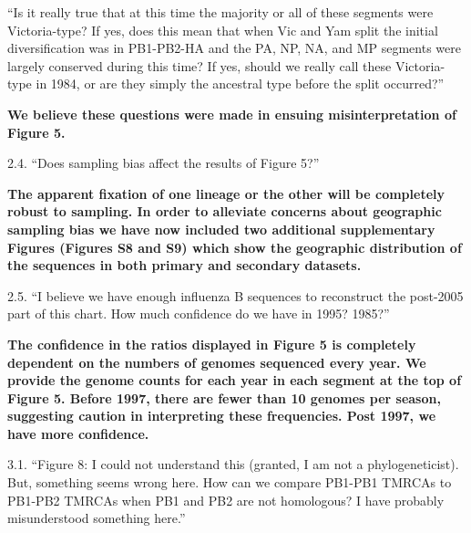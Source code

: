 \documentclass[11pt,oneside,letterpaper]{article}
\begin{document}
``Is it really true that at this time the majority or all of these segments were Victoria-type?
If yes, does this mean that when Vic and Yam split the initial diversification was in PB1-PB2-HA and the PA, NP, NA, and MP segments were largely conserved during this time?
If yes, should we really call these Victoria-type in 1984, or are they simply the ancestral type before the split occurred?''

\textbf{We believe these questions were made in ensuing misinterpretation of Figure 5.}

2.4. ``Does sampling bias affect the results of Figure 5?''

\textbf{The apparent fixation of one lineage or the other will be completely robust to sampling.
In order to alleviate concerns about geographic sampling bias we have now included two additional supplementary Figures (Figures S8 and S9) which show the geographic distribution of the sequences in both primary and secondary datasets.}

2.5. ``I believe we have enough influenza B sequences to reconstruct the post-2005 part of this chart. How much confidence do we have in 1995? 1985?''

\textbf{The confidence in the ratios displayed in Figure 5 is completely dependent on the numbers of genomes sequenced every year.
We provide the genome counts for each year in each segment at the top of Figure 5.
Before 1997, there are fewer than 10 genomes per season, suggesting caution in interpreting these frequencies.
Post 1997, we have more confidence.}

3.1. ``Figure 8:  I could not understand this (granted, I am not a phylogeneticist).
But, something seems wrong here.
How can we compare PB1-PB1 TMRCAs to PB1-PB2 TMRCAs when PB1 and PB2 are not homologous?
I have probably misunderstood something here.''
\end{document}
